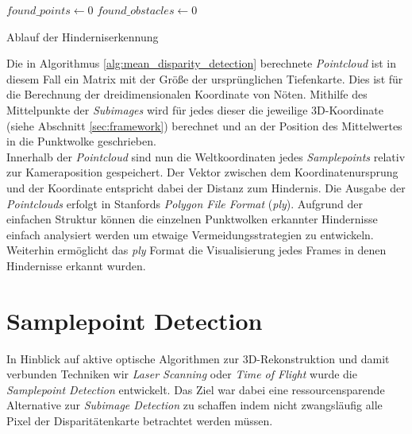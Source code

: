 %
\begin{algorithm}[h]
\begin{algorithmic}[1]
		\State $found\_points \gets 0$
		\State $found\_obstacles \gets 0$
			\EndIf
		\EndFor
		\EndIf 
    \EndProcedure
\end{algorithmic}
\caption{Ablauf der Hinderniserkennung}
\label{alg:mean_disparity_detection}
\end{algorithm}

\noindent
Die in Algorithmus \ref{alg:mean_disparity_detection} berechnete \emph{Pointcloud} ist in diesem Fall ein Matrix mit der Größe der ursprünglichen Tiefenkarte. Dies ist für die Berechnung der dreidimensionalen Koordinate von Nöten. Mithilfe des Mittelpunkte der \emph{Subimages} wird für jedes dieser die jeweilige 3D-Koordinate (siehe Abschnitt \ref{sec:framework}) berechnet und an der Position des Mittelwertes in die Punktwolke geschrieben.\\

\noindent
Innerhalb der \emph{Pointcloud} sind nun die Weltkoordinaten jedes \emph{Samplepoints} relativ zur Kameraposition gespeichert. Der Vektor zwischen dem Koordinatenursprung und der Koordinate entspricht dabei der Distanz zum Hindernis. Die Ausgabe der \emph{Pointclouds} erfolgt in Stanfords \emph{Polygon File Format} (\emph{ply}). Aufgrund der einfachen Struktur können die einzelnen Punktwolken erkannter Hindernisse einfach analysiert werden um etwaige Vermeidungsstrategien zu entwickeln. Weiterhin ermöglicht das \emph{ply} Format die Visualisierung jedes Frames in denen Hindernisse erkannt wurden.

\section{Samplepoint Detection}
\label{sec:samplepoint_detection}
In Hinblick auf aktive optische Algorithmen zur 3D-Rekonstruktion und damit verbunden Techniken wir \emph{Laser Scanning} oder \emph{Time of Flight} wurde die \emph{Samplepoint Detection} entwickelt. Das Ziel war dabei eine ressourcensparende Alternative zur \emph{Subimage Detection} zu schaffen indem nicht zwangsläufig alle Pixel der Disparitätenkarte betrachtet werden müssen.\\

